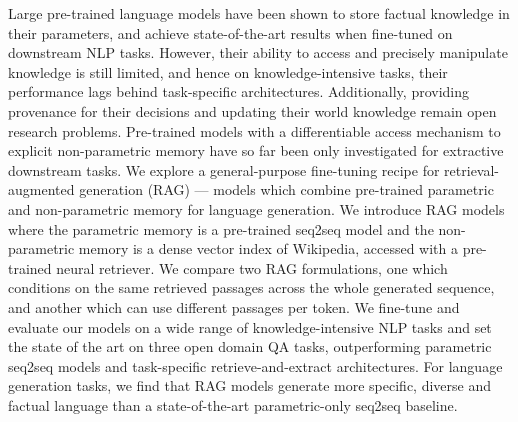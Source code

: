 
Large pre-trained language models have been shown to store factual knowledge in their parameters, and achieve state-of-the-art results when fine-tuned on downstream NLP tasks.
However, their ability to access and precisely manipulate knowledge is still limited, and hence on knowledge-intensive tasks, their performance lags behind task-specific architectures.
%
Additionally, providing provenance for their decisions and updating their world knowledge remain open research problems.
Pre-trained models with a differentiable access mechanism to explicit non-parametric memory
% 
have so far been only investigated for extractive downstream tasks.
%  
We explore a general-purpose fine-tuning recipe for retrieval-augmented generation (RAG)  --- models which combine pre-trained parametric and non-parametric memory for language generation. 
We introduce RAG models where the parametric memory is a pre-trained seq2seq model and the non-parametric memory is a dense vector index of Wikipedia, accessed with a pre-trained neural retriever. 
% 
We compare two RAG formulations, one which conditions on the same retrieved passages across the whole generated sequence, and another which can use different passages per token.
We fine-tune and evaluate our models on a wide range of knowledge-intensive NLP tasks and set the state of the art on three open domain QA tasks, outperforming parametric seq2seq models and task-specific retrieve-and-extract architectures.  
For language generation tasks, we find that RAG models generate more specific, diverse and factual language than a state-of-the-art parametric-only seq2seq baseline. 
% 